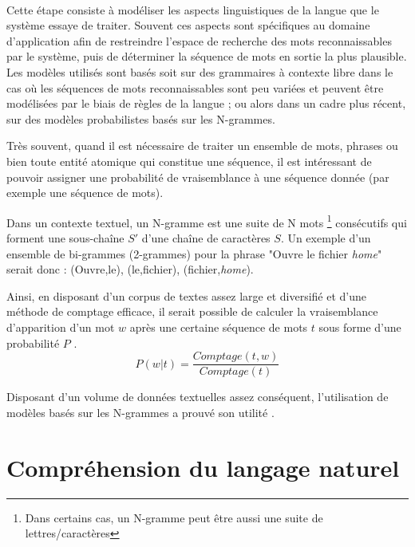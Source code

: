 \paragraph{}
Cette étape consiste à modéliser les aspects linguistiques de la langue que le système essaye de traiter. Souvent ces aspects sont spécifiques au domaine d'application afin de restreindre l'espace de recherche des mots reconnaissables par le système, puis de déterminer la séquence de mots en sortie la plus plausible. Les modèles utilisés sont basés soit sur des grammaires à contexte libre dans le cas où les séquences de mots reconnaissables sont peu variées et peuvent être modélisées par le biais de règles de la langue \citep{LM_grammar}; ou alors dans un cadre plus récent, sur des modèles probabilistes basés sur les N-grammes.
\par
\label{n-grams}
Très souvent, quand il est nécessaire de traiter un ensemble de mots, phrases ou bien toute entité atomique qui constitue une séquence, il est intéressant de pouvoir assigner une probabilité de vraisemblance à une séquence donnée (par exemple une séquence de mots). 
\par Dans un contexte textuel, un N-gramme est une suite de N mots \footnote{Dans certains cas, un N-gramme peut être aussi une suite de lettres/caractères} consécutifs qui forment une sous-chaîne $S'$ d'une chaîne de caractères $S$. Un exemple d'un ensemble de bi-grammes (2-grammes) pour la phrase "Ouvre le fichier \textit{home}" serait donc : (Ouvre,le), (le,fichier), (fichier,\textit{home}).
\par 
Ainsi, en disposant d'un corpus de textes assez large et diversifié et d'une méthode de comptage efficace, il serait possible de calculer la vraisemblance d'apparition d'un mot $w$ après une certaine séquence de mots $t$ sous forme d'une probabilité $P$ \citep{nlp_ngrams}.
\begin{equation}
P(w|t) = \frac{Comptage(t,w)}{Comptage(t)}
\end{equation}
\par
Disposant d'un volume de données textuelles assez conséquent, l'utilisation de modèles basés sur les N-grammes a prouvé son utilité \citep{nlp_ngrams,speech_reco_Yu2015,LM_n-grams} .


\section{Compréhension du langage naturel}
